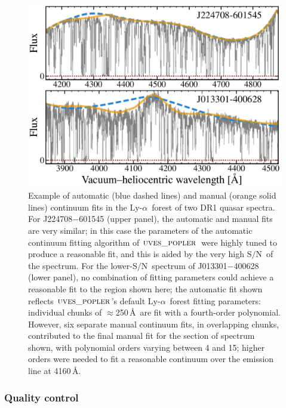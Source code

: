 \documentclass[fleqn,usenatbib,usedcolumn]{mnras}
\newcommand{\SN}{\ensuremath{\textrm{S/N}}}
\newcommand{\lya}{\ensuremath{\textrm{Ly-}\alpha}}
\newcommand{\popler}{\ensuremath{\textsc{uves\_popler}}}
\begin{document}
\begin{figure}
\begin{center}
\includegraphics[width=0.95\columnwidth]{DR1_Lya_cont.pdf}
\vspace{-1em}
\caption{Example of automatic (blue dashed lines) and manual (orange solid lines) continuum fits in the \lya\ forest of two DR1 quasar spectra. For J224708$-$601545 (upper panel), the automatic and manual fits are very similar; in this case the parameters of the automatic continuum fitting algorithm of \popler\ were highly tuned to produce a reasonable fit, and this is aided by the very high \SN\ of the spectrum. For the lower-\SN\ spectrum of J013301$-$400628 (lower panel), no combination of fitting parameters could achieve a reasonable fit to the region shown here; the automatic fit shown reflects \popler's default \lya\ forest fitting parameters: individual chunks of $\approx$250\,\AA\ are fit with a fourth-order polynomial. However, six separate manual continuum fits, in overlapping chunks, contributed to the final manual fit for the section of spectrum shown, with polynomial orders varying between 4 and 15; higher orders were needed to fit a reasonable continuum over the emission line at 4160\,\AA.}
\label{f:Lyacont}
\end{center}
\end{figure}

\subsubsection{Quality control}\label{sss:quality}
\end{document}
